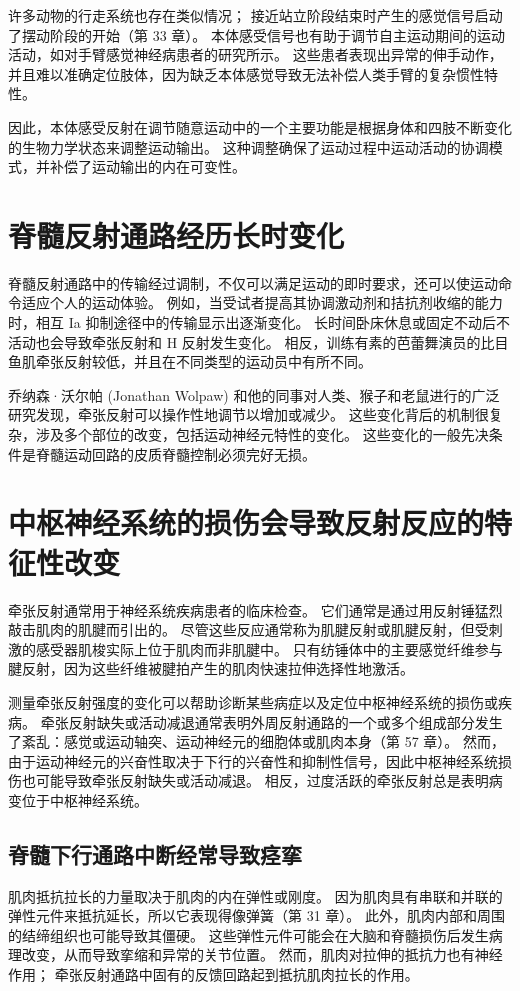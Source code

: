许多动物的行走系统也存在类似情况； 接近站立阶段结束时产生的感觉信号启动了摆动阶段的开始（第 33 章）。 本体感受信号也有助于调节自主运动期间的运动活动，如对手臂感觉神经病患者的研究所示。 这些患者表现出异常的伸手动作，并且难以准确定位肢体，因为缺乏本体感觉导致无法补偿人类手臂的复杂惯性特性。

因此，本体感受反射在调节随意运动中的一个主要功能是根据身体和四肢不断变化的生物力学状态来调整运动输出。 这种调整确保了运动过程中运动活动的协调模式，并补偿了运动输出的内在可变性。


\section{脊髓反射通路经历长时变化}
脊髓反射通路中的传输经过调制，不仅可以满足运动的即时要求，还可以使运动命令适应个人的运动体验。 例如，当受试者提高其协调激动剂和拮抗剂收缩的能力时，相互 Ia 抑制途径中的传输显示出逐渐变化。 长时间卧床休息或固定不动后不活动也会导致牵张反射和 H 反射发生变化。 相反，训练有素的芭蕾舞演员的比目鱼肌牵张反射较低，并且在不同类型的运动员中有所不同。

乔纳森·沃尔帕 (Jonathan Wolpaw) 和他的同事对人类、猴子和老鼠进行的广泛研究发现，牵张反射可以操作性地调节以增加或减少。 这些变化背后的机制很复杂，涉及多个部位的改变，包括运动神经元特性的变化。 这些变化的一般先决条件是脊髓运动回路的皮质脊髓控制必须完好无损。


\section{中枢神经系统的损伤会导致反射反应的特征性改变}
牵张反射通常用于神经系统疾病患者的临床检查。 它们通常是通过用反射锤猛烈敲击肌肉的肌腱而引出的。 尽管这些反应通常称为肌腱反射或肌腱反射，但受刺激的感受器肌梭实际上位于肌肉而非肌腱中。 只有纺锤体中的主要感觉纤维参与腱反射，因为这些纤维被腱拍产生的肌肉快速拉伸选择性地激活。

测量牵张反射强度的变化可以帮助诊断某些病症以及定位中枢神经系统的损伤或疾病。 牵张反射缺失或活动减退通常表明外周反射通路的一个或多个组成部分发生了紊乱：感觉或运动轴突、运动神经元的细胞体或肌肉本身（第 57 章）。 然而，由于运动神经元的兴奋性取决于下行的兴奋性和抑制性信号，因此中枢神经系统损伤也可能导致牵张反射缺失或活动减退。 相反，过度活跃的牵张反射总是表明病变位于中枢神经系统。

\subsection{脊髓下行通路中断经常导致痉挛}
肌肉抵抗拉长的力量取决于肌肉的内在弹性或刚度。 因为肌肉具有串联和并联的弹性元件来抵抗延长，所以它表现得像弹簧（第 31 章）。 此外，肌肉内部和周围的结缔组织也可能导致其僵硬。 这些弹性元件可能会在大脑和脊髓损伤后发生病理改变，从而导致挛缩和异常的关节位置。 然而，肌肉对拉伸的抵抗力也有神经作用； 牵张反射通路中固有的反馈回路起到抵抗肌肉拉长的作用。


